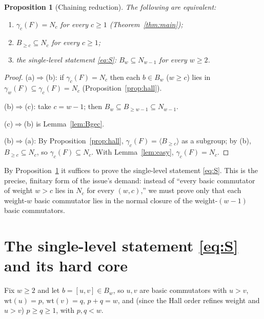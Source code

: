 \documentclass{amsart}
\newtheorem{proposition}{Proposition}
\theoremstyle{definition}
\theoremstyle{remark}
\begin{document}
\begin{proposition}[Chaining reduction]\label{prop:chain}
The following are equivalent:
\begin{enumerate}
\item[\textup{(a)}] $\gamma_c(F)=N_c$ for every $c\ge1$ \textup{(Theorem~\ref{thm:main})};
\item[\textup{(b)}] $B_{\ge c}\subseteq N_c$ for every $c\ge1$;
\item[\textup{(c)}] the single-level statement \eqref{eq:S}: $B_w\subseteq N_{w-1}$ for every $w\ge2$.
\end{enumerate}
\end{proposition}
\begin{proof}
(a)$\Rightarrow$(b): if $\gamma_c(F)=N_c$ then each $b\in B_w$ ($w\ge c$) lies in
$\gamma_w(F)\subseteq\gamma_c(F)=N_c$ (Proposition~\ref{prop:hall}).

(b)$\Rightarrow$(c): take $c=w-1$; then $B_w\subseteq B_{\ge w-1}\subseteq N_{w-1}$.

(c)$\Rightarrow$(b) is Lemma~\ref{lem:Bgec}.

(b)$\Rightarrow$(a): By Proposition~\ref{prop:hall}, $\gamma_c(F)=\langle B_{\ge
c}\rangle$ as a subgroup; by (b), $B_{\ge c}\subseteq N_c$, so
$\gamma_c(F)\subseteq N_c$. With Lemma~\ref{lem:easy}, $\gamma_c(F)=N_c$.
\end{proof}

By Proposition~\ref{prop:chain} it suffices to prove the single-level statement
\eqref{eq:S}. This is the precise, finitary form of the issue's demand: instead of
``every basic commutator of weight $w>c$ lies in $N_c$ for every $(w,c)$,'' we must
prove only that each weight-$w$ basic commutator lies in the normal closure of the
weight-$(w-1)$ basic commutators.

\section{The single-level statement \eqref{eq:S} and its hard core}\label{sec:hard}

Fix $w\ge2$ and let $b=[u,v]\in B_w$, so $u,v$ are basic commutators with $u>v$,
$\mathrm{wt}(u)=p$, $\mathrm{wt}(v)=q$, $p+q=w$, and (since the Hall order refines
weight and $u>v$) $p\ge q\ge1$, with $p,q<w$.
\end{document}
